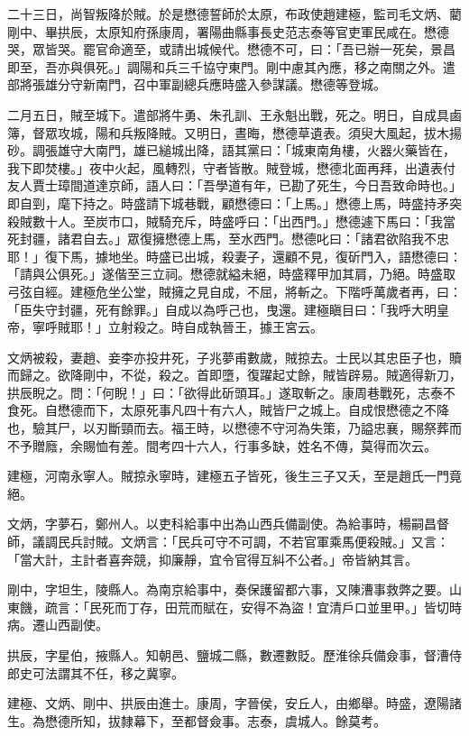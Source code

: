 \begin{pinyinscope}
{{二十三日，尚智叛降於賊。於是懋德誓師於太原，布政使趙建極，監司毛文炳、藺剛中、畢拱辰，太原知府孫康周，署陽曲縣事長史范志泰等官吏軍民咸在。懋德哭，眾皆哭。罷官命適至，或請出城候代。懋德不可，曰：「吾已辦一死矣，景昌即至，吾亦與俱死。」調陽和兵三千協守東門。剛中慮其內應，移之南關之外。遣部將張雄分守新南門，召中軍副總兵應時盛入參謀議。懋德等登城。

二月五日，賊至城下。遣部將牛勇、朱孔訓、王永魁出戰，死之。明日，自成具鹵簿，督眾攻城，陽和兵叛降賊。又明日，晝晦，懋德草遺表。須臾大風起，拔木揚砂。調張雄守大南門，雄已縋城出降，語其黨曰：「城東南角樓，火器火藥皆在，我下即焚樓。」夜中火起，風轉烈，守者皆散。賊登城，懋德北面再拜，出遺表付友人賈士璋間道達京師，語人曰：「吾學道有年，已勘了死生，今日吾致命時也。」即自剄，麾下持之。時盛請下城巷戰，顧懋德曰：「上馬。」懋德上馬，時盛持矛突殺賊數十人。至炭市口，賊騎充斥，時盛呼曰：「出西門。」懋德遽下馬曰：「我當死封疆，諸君自去。」眾復擁懋德上馬，至水西門。懋德叱曰：「諸君欲陷我不忠耶！」復下馬，據地坐。時盛已出城，殺妻子，還顧不見，復斫門入，語懋德曰：「請與公俱死。」遂偕至三立祠。懋德就縊未絕，時盛釋甲加其肩，乃絕。時盛取弓弦自經。建極危坐公堂，賊擁之見自成，不屈，將斬之。下階呼萬歲者再，曰：「臣失守封疆，死有餘罪。」自成以為呼己也，曳還。建極瞋目曰：「我呼大明皇帝，寧呼賊耶！」立射殺之。時自成執晉王，據王宮云。

文炳被殺，妻趙、妾李亦投井死，子兆夢甫數歲，賊掠去。士民以其忠臣子也，贖而歸之。欲降剛中，不從，殺之。首即墮，復躍起丈餘，賊皆辟易。賊適得新刀，拱辰睨之。問：「何睨！」曰：「欲得此斫頭耳。」遂取斬之。康周巷戰死，志泰不食死。自懋德而下，太原死事凡四十有六人，賊皆尸之城上。自成恨懋德之不降也，驗其尸，以刃斷頸而去。福王時，以懋德不守河為失策，乃謚忠襄，賜祭葬而不予贈廕，余賜恤有差。間考四十六人，行事多缺，姓名不傳，莫得而次云。

建極，河南永寧人。賊掠永寧時，建極五子皆死，後生三子又夭，至是趙氏一門竟絕。

文炳，字夢石，鄭州人。以吏科給事中出為山西兵備副使。為給事時，楊嗣昌督師，議調民兵討賊。文炳言：「民兵可守不可調，不若官軍乘馬便殺賊。」又言：「當大計，主計者喜奔競，抑廉靜，宜令官得互糾不公者。」帝皆納其言。

剛中，字坦生，陵縣人。為南京給事中，奏保護留都六事，又陳漕事救弊之要。山東饑，疏言：「民死而丁存，田荒而賦在，安得不為盜！宜清戶口並里甲。」皆切時病。遷山西副使。

拱辰，字星伯，掖縣人。知朝邑、鹽城二縣，數遷數貶。歷淮徐兵備僉事，督漕侍郎史可法謂其不任，移之冀寧。

建極、文炳、剛中、拱辰由進士。康周，字晉侯，安丘人，由鄉舉。時盛，遼陽諸生。為懋德所知，拔隸幕下，至都督僉事。志泰，虞城人。餘莫考。

}}
\end{pinyinscope}
